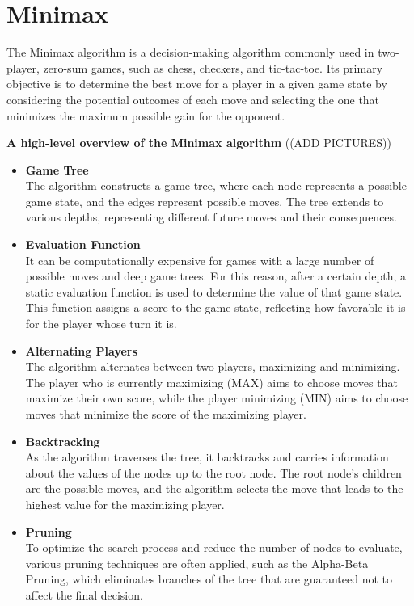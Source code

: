 \section{Minimax}

The Minimax algorithm is a decision-making algorithm commonly used in two-player, zero-sum games, such as chess, checkers, and tic-tac-toe. Its primary objective is to determine the best move for a player in a given game state by considering the potential outcomes of each move and selecting the one that minimizes the maximum possible gain for the opponent.


\textbf{A high-level overview of the Minimax algorithm} ((ADD PICTURES))

\begin{itemize}
    \item \textbf{Game Tree} \\
    The algorithm constructs a game tree, where each node represents a possible game state, and the edges represent possible moves. The tree extends to various depths, representing different future moves and their consequences.

    \item \textbf{Evaluation Function} \\
    It can be computationally expensive for games with a large number of possible moves and deep game trees. For this reason, after a certain depth, a static evaluation function is used to determine the value of that game state. This function assigns a score to the game state, reflecting how favorable it is for the player whose turn it is.

    \item \textbf{Alternating Players} \\
    The algorithm alternates between two players, maximizing and minimizing. The player who is currently maximizing (MAX) aims to choose moves that maximize their own score, while the player minimizing (MIN) aims to choose moves that minimize the score of the maximizing player.

    \item \textbf{Backtracking} \\
    As the algorithm traverses the tree, it backtracks and carries information about the values of the nodes up to the root node. The root node's children are the possible moves, and the algorithm selects the move that leads to the highest value for the maximizing player.

    \item \textbf{Pruning} \\
    To optimize the search process and reduce the number of nodes to evaluate, various pruning techniques are often applied, such as the Alpha-Beta Pruning, which eliminates branches of the tree that are guaranteed not to affect the final decision.
\end{itemize}